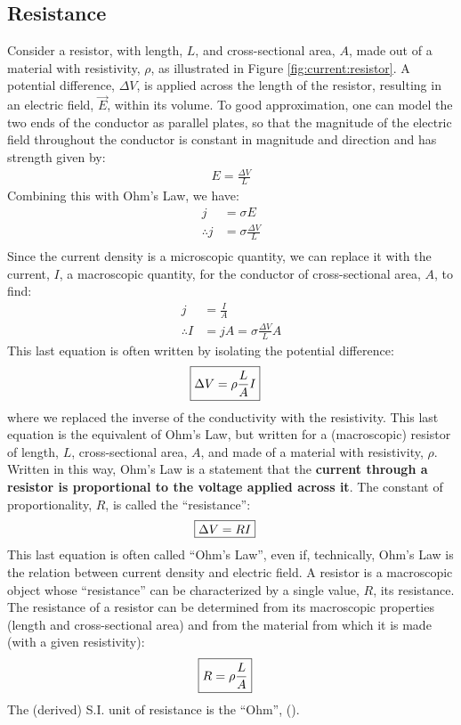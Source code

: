 \subsection{Resistance}
Consider a resistor, with length, $L$, and cross-sectional area, $A$, made out of a material with resistivity, $\rho$, as illustrated in Figure \ref{fig:current:resistor}.
A potential difference, $\Delta V$, is applied across the length of the resistor, resulting in an electric field, $\vec E$, within its volume. To good approximation, one can model the two ends of the conductor as parallel plates, so that the magnitude of the electric field throughout the conductor is constant in magnitude and direction and has strength given by:
\begin{align*}
E=\frac{\Delta V}{L}
\end{align*}
Combining this with Ohm's Law, we have:
\begin{align*}
j&=\sigma E\\
\therefore j&=\sigma\frac{\Delta V}{L}\\
\end{align*}
Since the current density is a microscopic quantity, we can replace it with the current, $I$, a macroscopic quantity, for the conductor of cross-sectional area, $A$, to find:
\begin{align*}
j&=\frac{I}{A}\\
\therefore I&=jA=\sigma\frac{\Delta V}{L}A
\end{align*}
This last equation is often written by isolating the potential difference:
\begin{align*}
\Aboxed{\Delta V = \rho \frac{L}{A} I}
\end{align*}
where we replaced the inverse of the conductivity with the resistivity. This last equation is the equivalent of Ohm's Law, but written for a (macroscopic) resistor of length, $L$, cross-sectional area, $A$, and made of a material with resistivity, $\rho$. Written in this way, Ohm's Law is a statement that the \textbf{current through a resistor is proportional to the voltage applied across it}. The constant of proportionality, $R$, is called the ``resistance'':
\begin{align*}
\Aboxed{\Delta V = RI}
\end{align*}
This last equation is often called ``Ohm's Law'', even if, technically, Ohm's Law is the relation between current density and electric field. A resistor is a macroscopic object whose ``resistance'' can be characterized by a single value, $R$, its resistance. The resistance of a resistor can be determined from its macroscopic properties (length and cross-sectional area) and from the material from which it is made (with a given resistivity):
\begin{align*}
\Aboxed{R = \rho \frac{L}{A} }
\end{align*}
The (derived) S.I. unit of resistance is the ``Ohm'', (\si{\Omega}).


